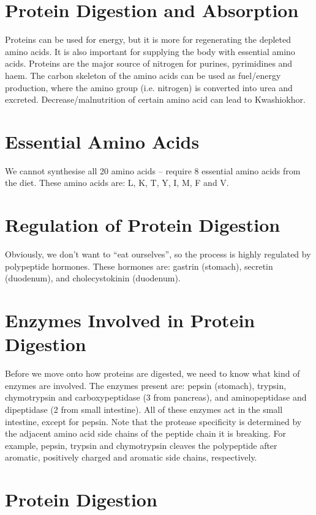 \section{Protein Digestion and Absorption}

Proteins can be used for energy, but it is more for regenerating the depleted amino acids.
It is also important for supplying the body with essential amino acids.
Proteins are the major source of nitrogen for purines, pyrimidines and haem.
The carbon skeleton of the amino acids can be used as fuel/energy production, where the amino group (i.e. nitrogen) is converted into urea and excreted.
Decrease/malnutrition of certain amino acid can lead to Kwashiokhor.

\section{Essential Amino Acids}

We cannot synthesise all 20 amino acids -- require 8 essential amino acids from the diet.
These amino acids are: L, K, T, Y, I, M, F and V.

\section{Regulation of Protein Digestion}

Obviously, we don't want to ``eat ourselves'', so the process is highly regulated by polypeptide hormones.
These hormones are: gastrin (stomach), secretin (duodenum), and cholecystokinin (duodenum).

\section{Enzymes Involved in Protein Digestion}

Before we move onto how proteins are digested, we need to know what kind of enzymes are involved.
The enzymes present are: pepsin (stomach), trypsin, chymotrypsin and carboxypeptidase (3 from pancreas), and aminopeptidase and dipeptidase (2 from small intestine).
All of these enzymes act in the small intestine, except for pepsin.
Note that the protease specificity is determined by the adjacent amino acid side chains of the peptide chain it is breaking.
For example, pepsin, trypsin and chymotrypsin cleaves the polypeptide after aromatic, positively charged and aromatic side chains, respectively.

\section{Protein Digestion}

